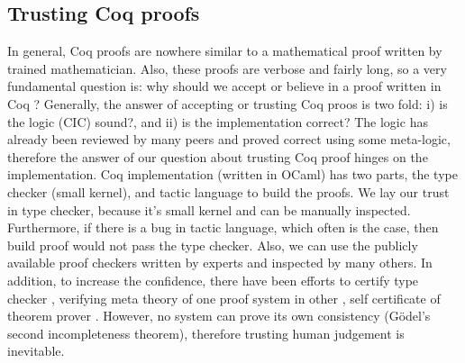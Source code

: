  \subsection{Trusting Coq proofs}
 \label{sec:coqproof}
  In general, Coq proofs are nowhere similar to a mathematical 
  proof written by trained mathematician. Also, these proofs 
  are verbose and fairly long, so a 
  very fundamental question is: why should we 
  accept or believe in a proof written in Coq \citep{pollack1998believe}?  Generally, the answer of 
	accepting or trusting Coq proos is two fold:
  i) is the logic (CIC) sound?, and ii) is the implementation correct?
  The logic has already been reviewed by many peers and proved correct 
  using some meta-logic, therefore the answer of our question about trusting Coq proof 
  hinges on the implementation. 
  Coq implementation (written in OCaml)  has two parts, the type checker (small kernel), 
  and tactic language to build the proofs.
  We lay our trust in type checker, because it's small kernel and can be 
  manually inspected. Furthermore, if there
  is a bug in tactic language, which often is the case, then build proof would 
  not pass the type checker.  Also, we can use the publicly available proof 
  checkers written by experts and inspected by many others. In addition, to increase the 
  confidence, there have been 
  efforts to certify type checker \citep{Appel2003}
  \citep{barras1996coq}, verifying meta theory of one proof system 
  in other \citep{10.1007/978-3-319-08970-6_3}, self certificate of 
  theorem prover \citep{10.1007/11814771_17}. However, no system can 
  prove its own consistency (G{\"o}del's second incompleteness theorem), therefore
  trusting human judgement is inevitable.
  
 
